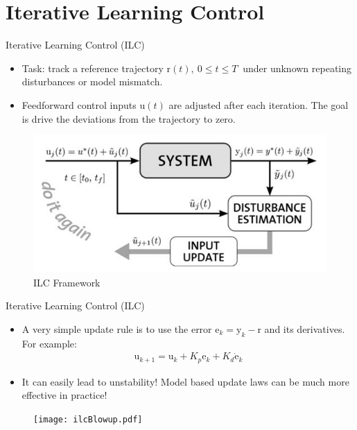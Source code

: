 \documentclass[handout]{beamer}
\newcommand{\boldvec}[1]{\boldsymbol{\mathrm{#1}}}
\let\vec\boldvec
\newcommand{\state}{\vec{y}} %
\newcommand{\error}{\vec{e}} %
\newcommand{\traj}{\vec{r}} %
\newcommand{\sysInput}{\vec{u}} %
\begin{document}
\section{Iterative Learning Control}
%
\begin{frame}{Iterative Learning Control (ILC)}
\begin{itemize}
\item Task: track a reference trajectory $\traj(t), \ 0 \leq t \leq T \ $ under unknown repeating disturbances or model mismatch.
\item Feedforward control inputs $\sysInput(t)$ are adjusted after each iteration. The goal is drive the deviations from the trajectory to zero. 
\end{itemize}
\begin{figure}
\center
\includegraphics[scale=0.25]{ilc_framework}			
\caption{ILC Framework}
\end{figure}
\end{frame}
%
\begin{frame}{Iterative Learning Control (ILC)}
\begin{itemize}
\item A very simple update rule is to use the error $\error_k = \state_k - \traj$ and its derivatives. For example:
\begin{equation*}
\begin{aligned}
\sysInput_{k+1} = \sysInput_{k} + K_{p}\error_k + K_{d}\dot{\error}_k
\end{aligned}
\end{equation*}
\item It can easily lead to unstability! Model based update laws can be much more effective in practice!
\end{itemize}
\begin{figure}
\center
\texttt{[image: ilcBlowup.pdf]}			
\end{figure}
\end{frame}
\end{document}
